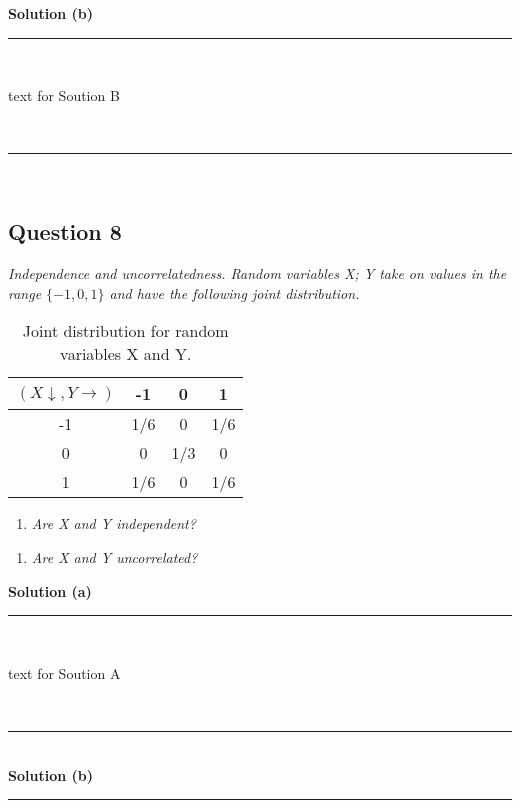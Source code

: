 \documentclass{article}
\begin{document}
\textbf{Solution (b)}

\noindent\rule{\textwidth}{0.4pt}\\

\parbox{\textwidth}{text for Soution B}\\

\noindent\rule{\textwidth}{0.4pt}\\

\newpage

\subsection*{Question 8}
\textit{Independence and uncorrelatedness. Random variables X; Y take on values in the range $\{-1,0,1\}$ and have the following joint distribution.}\\

\begin{table}[h]
\centering
\begin{tabular}{c|ccc}
$(X\downarrow ,Y \rightarrow)$ & -1 & 0 & 1 \\ \hline
-1 & 1/6 & 0 & 1/6 \\
0 & 0 & 1/3 & 0 \\
1 & 1/6 & 0 & 1/6 \\
\end{tabular}
\caption{Joint distribution for random variables X and Y.}
\label{tab:example_fractions}
\end{table}



\begin{enumerate}[label=(a)]
  \item \textit{Are X and Y independent?}
\end{enumerate}

\begin{enumerate}[label=(b)]
  \item \textit{Are X and Y uncorrelated?}
\end{enumerate}

\textbf{Solution (a)}

\noindent\rule{\textwidth}{0.4pt}\\

\parbox{\textwidth}{text for Soution A}\\

\noindent\rule{\textwidth}{0.4pt}\\

\textbf{Solution (b)}

\noindent\rule{\textwidth}{0.4pt}\\
\end{document}
